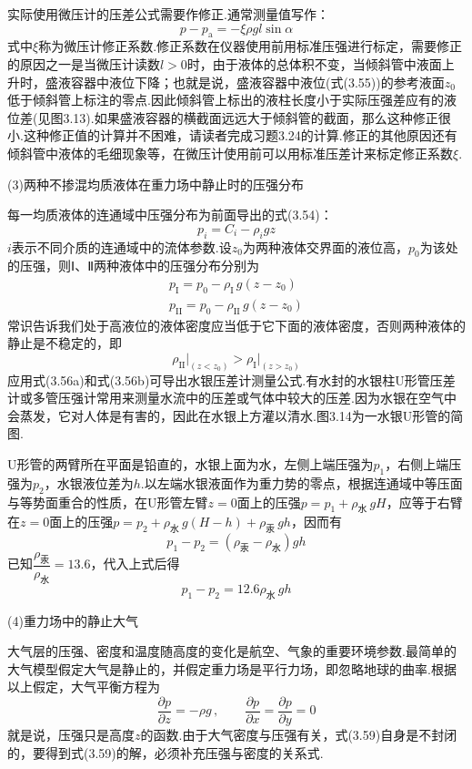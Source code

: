 实际使用微压计的压差公式需要作修正.通常测量值写作：
\[
p-p_{\mathrm{a}}=-\xi\rho g l\sin\alpha
\]
式中$\xi$称为微压计修正系数.修正系数在仪器使用前用标准压强进行标定，需要修正的原因之一是当微压计读数$l>0$时，由于液体的总体积不变，当倾斜管中液面上升时，盛液容器中液位下降；也就是说，盛液容器中液位(式(3.55))的参考液面$z_0$低于倾斜管上标注的零点.因此倾斜管上标出的液柱长度小于实际压强差应有的液位差(见图3.13).如果盛液容器的横截面远远大于倾斜管的截面，那么这种修正很小.这种修正值的计算并不困难，请读者完成习题3.24的计算.修正的其他原因还有倾斜管中液体的毛细现象等，在微压计使用前可以用标准压差计来标定修正系数$\xi$.

(3)两种不掺混均质液体在重力场中静止时的压强分布

每一均质液体的连通域中压强分布为前面导出的式(3.54)：
\begin{equation*}
p_i=C_i-\rho_i g z
\tag{3.56a}
\end{equation*}
$i$表示不同介质的连通域中的流体参数.设$z_0$为两种液体交界面的液位高，$p_0$为该处的压强，则Ⅰ、Ⅱ两种液体中的压强分布分别为
\begin{gather*}
p_{\mathrm{I}}=p_0-\rho_{\mathrm{I}}\,g(z-z_0)\tag{3.56b}\\[2pt]
p_{\mathrm{II}}=p_0-\rho_{\mathrm{II}}\,g(z-z_0)\tag{3.56c}
\end{gather*}
常识告诉我们处于高液位的液体密度应当低于它下面的液体密度，否则两种液体的静止是不稳定的，即
\begin{equation*}
\rho_{\mathrm{II}}\Big|_{(z<z_0)}>\rho_{\mathrm{I}}\Big|_{(z>z_0)}
\tag{3.57}
\end{equation*}
应用式(3.56a)和式(3.56b)可导出水银压差计测量公式.有水封的水银柱U形管压差计或多管压强计常用来测量水流中的压差或气体中较大的压差.因为水银在空气中会蒸发，它对人体是有害的，因此在水银上方灌以清水.图3.14为一水银U形管的简图.

U形管的两臂所在平面是铅直的，水银上面为水，左侧上端压强为$p_1$，右侧上端压强为$p_2$，水银液位差为$h$.以左端水银液面作为重力势的零点，根据连通域中等压面与等势面重合的性质，在U形管左臂$z=0$面上的压强$p=p_1+\rho_{\text{水}}\,gH$，应等于右臂在$z=0$面上的压强$p=p_2+\rho_{\text{水}}\,g(H-h)+\rho_{\text{汞}}\,gh$，因而有
\begin{equation*}
p_1-p_2=(\rho_{\text{汞}}-\rho_{\text{水}})gh
\tag{3.58}
\end{equation*}
已知$\dfrac{\rho_{\text{汞}}}{\rho_{\text{水}}}=13.6$，代入上式后得
\[
p_1-p_2=12.6\rho_{\text{水}}\,gh
\]

(4)重力场中的静止大气

大气层的压强、密度和温度随高度的变化是航空、气象的重要环境参数.最简单的大气模型假定大气是静止的，并假定重力场是平行力场，即忽略地球的曲率.根据以上假定，大气平衡方程为
\begin{equation*}
\frac{\partial p}{\partial z}=-\rho g\,,\qquad \frac{\partial p}{\partial x}=\frac{\partial p}{\partial y}=0
\tag{3.59}
\end{equation*}
就是说，压强只是高度$z$的函数.由于大气密度与压强有关，式(3.59)自身是不封闭的，要得到式(3.59)的解，必须补充压强与密度的关系式.

